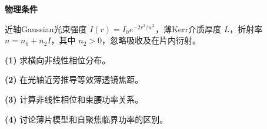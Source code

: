 \textbf{物理条件}\par 近轴Gaussian光束强度 \(I(r)=I_0e^{-2r^2/w^2}\)，薄Kerr介质厚度 \(L\)，折射率 \(n=n_0+n_2I\)，其中 \(n_2>0\)，忽略吸收及在片内衍射。
\par\noindent\textbf{(1)} 求横向非线性相位分布。
\par\noindent\textbf{(2)} 在光轴近旁推导等效薄透镜焦距。
\par\noindent\textbf{(3)} 计算非线性相位和束腰功率关系。
\par\noindent\textbf{(4)} 讨论薄片模型和自聚焦临界功率的区别。
